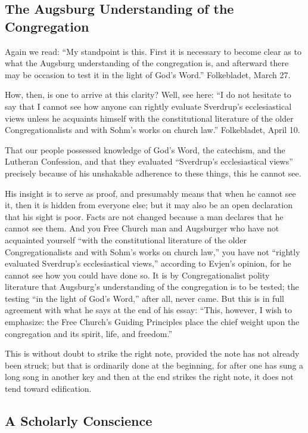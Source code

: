 
\subsection{The Augsburg Understanding of the Congregation}

Again we read: “My standpoint is this. First it is necessary to become clear as to what the Augsburg understanding of the congregation is, and afterward there may be occasion to test it in the light of God’s Word.” Folkebladet, March 27.

How, then, is one to arrive at this clarity? Well, see here: “I do not hesitate to say that I cannot see how anyone can rightly evaluate Sverdrup’s ecclesiastical views unless he acquaints himself with the constitutional literature of the older Congregationalists and with Sohm’s works on church law.” Folkebladet, April 10.

That our people possessed knowledge of God’s Word, the catechism, and the Lutheran Confession, and that they evaluated “Sverdrup’s ecclesiastical views” precisely because of his unshakable adherence to these things, this he cannot see.

His insight is to serve as proof, and presumably means that when he cannot see it, then it is hidden from everyone else; but it may also be an open declaration that his sight is poor. Facts are not changed because a man declares that he cannot see them. And you Free Church man and Augsburger who have not acquainted yourself “with the constitutional literature of the older Congregationalists and with Sohm’s works on church law,” you have not “rightly evaluated Sverdrup’s ecclesiastical views,” according to Evjen’s opinion, for he cannot see how you could have done so. It is by Congregationalist polity literature that Augsburg’s understanding of the congregation is to be tested; the testing “in the light of God’s Word,” after all, never came. But this is in full agreement with what he says at the end of his essay: “This, however, I wish to emphasize: the Free Church’s Guiding Principles place the chief weight upon the congregation and its spirit, life, and freedom.”

This is without doubt to strike the right note, provided the note has not already been struck; but that is ordinarily done at the beginning, for after one has sung a long song in another key and then at the end strikes the right note, it does not tend toward edification.

\subsection{A Scholarly Conscience}

